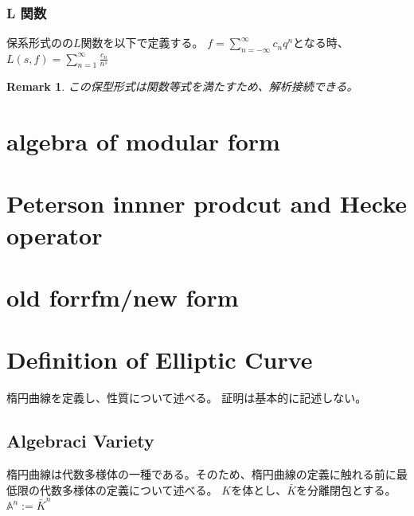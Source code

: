 \documentclass{ujarticle}
\newtheorem*{rem}{Remark}
\begin{document}
\subsubsection{L 関数}
\label{sub:L 関数}
保系形式のの$L$関数を以下で定義する。
$f= \sum_{n= -\infty}^{\infty}c_n q^n$となる時、
$L(s,f)= \sum_{n=1}^{ \infty } \frac{c_n}{n^s}$

\begin{rem}
 この保型形式は関数等式を満たすため、解析接続できる。
\end{rem}

\section{algebra of modular form}
\label{sec:algebra of modular form}




\section{Peterson innner prodcut and Hecke operator}
\label{sec:Peterson innner prodcut and Hecke operator}







\section{old forrfm/new form}
\label{sec:old forrfm/new form}



\section{Definition of Elliptic Curve}
\label{sec:Definition of Elliptic Curve}
楕円曲線を定義し、性質について述べる。
証明は基本的に記述しない。

\subsection{Algebraci Variety}
\label{sub:Algebraci Variety}
楕円曲線は代数多様体の一種である。そのため、楕円曲線の定義に触れる前に最低限の代数多様体の定義について述べる。
$K$を体とし、$\bar{K}$を分離閉包とする。
$\mathbb{A}^n:=\bar{K}^n$
\end{document}
